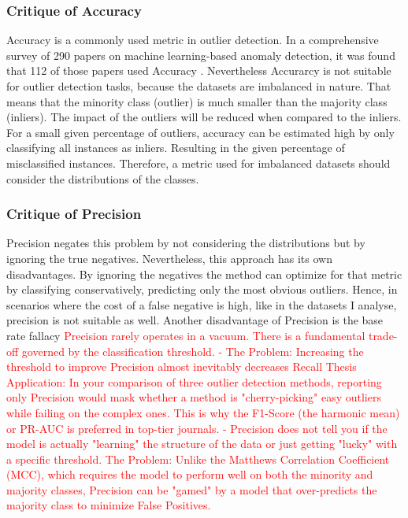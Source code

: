 \subsubsection{Critique of Accuracy}
Accuracy is a commonly used metric in outlier detection. 
In a comprehensive survey of 290 papers on machine learning-based anomaly detection, it was found that 112 of those papers used Accuracy \citep[p.78664]{nassif2021}. 
Nevertheless Accurarcy is not suitable for outlier detection tasks, because the datasets are imbalanced in nature. 
That means that the minority class (outlier) is much smaller than the majority class (inliers).
The impact of the outliers will be reduced when compared to the inliers.
For a small given percentage of outliers, accuracy can be estimated high by only classifying all instances as inliers.
Resulting in the given percentage of misclassified instances.
Therefore, a metric used for imbalanced datasets should consider the distributions of the classes. \citep[p.8]{branco2016survey}  


\subsubsection{Critique of Precision}
Precision negates this problem by not considering the distributions but by ignoring the true negatives. 
Nevertheless, this approach has its own disadvantages. 
By ignoring the negatives the method can optimize for that metric by classifying conservatively, predicting only the most obvious outliers.
Hence, in scenarios where the cost of a false negative is high, like in the datasets I analyse, precision is not suitable as well. 
Another disadvantage of Precision is the base rate fallacy 
\textcolor{red}{Precision rarely operates in a vacuum. There is a fundamental trade-off governed by the classification threshold.
    -   The Problem: Increasing the threshold to improve Precision almost inevitably decreases Recall %
    Thesis Application: In your comparison of three outlier detection methods, reporting only Precision would mask whether a method is "cherry-picking" easy outliers while failing on the complex ones. 
    This is why the F1-Score (the harmonic mean) or PR-AUC is preferred in top-tier journals.
    -   Precision does not tell you if the model is actually "learning" the structure of the data or just getting "lucky" with a specific threshold.
    The Problem: Unlike the Matthews Correlation Coefficient (MCC), which requires the model to perform well on both the minority and majority classes, Precision can be "gamed" by a model that over-predicts the majority class to minimize False Positives.
    }


